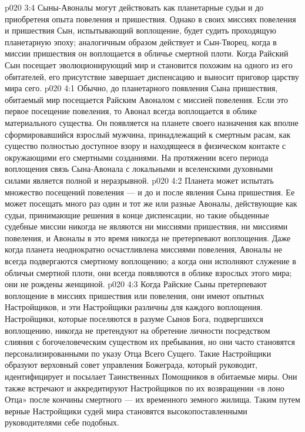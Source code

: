 \vs p020 3:4 Сыны\hyp{}Авоналы могут действовать как планетарные судьи и до приобретеня опыта повеления и пришествия. Однако в своих миссиях повеления и пришествия Сын, испытывающий воплощение, будет судить проходящую планетарную эпоху; аналогичным образом действует и Сын\hyp{}Творец, когда в миссии пришествия он воплощается в обличье смертной плоти. Когда Райский Сын посещает эволюционирующий мир и становится похожим на одного из его обитателей, его присутствие завершает диспенсацию и выносит приговор царству мира сего.
\vs p020 4:1 Обычно, до планетарного появления Сына пришествия, обитаемый мир посещается Райским Авоналом с миссией повеления. Если это первое посещение повеления, то Авонал всегда воплощается в облике материального существа. Он появляется на планете своего назначения как вполне сформировавшийся взрослый мужчина, принадлежащий к смертным расам, как существо полностью доступное взору и находящееся в физическом контакте с окружающими его смертными созданиями. На протяжении всего периода воплощения связь Сына\hyp{}Авонала с локальными и вселенскими духовными силами является полной и неразрывной.
\vs p020 4:2 Планета может испытать множество посещений повеления --- и до и после явления Сына пришествия. Ее может посещать много раз один и тот же или разные Авоналы, действующие как судьи, принимающие решения в конце диспенсации, но такие обыденные судебные миссии никогда не являются ни миссиями пришествия, ни миссиями повеления, и Авоналы в это время никогда не претерпевают воплощения. Даже когда планета неоднократно осчастливлена миссиями повеления, Авоналы не всегда подвергаются смертному воплощению; а когда они исполняют служение в обличьи смертной плоти, они всегда появляются в облике взрослых этого мира; они не рождены женщиной.
\vs p020 4:3 Когда Райские Сыны претерпевают воплощение в миссиях пришествия или повеления, они имеют опытных Настройщиков, и эти Настройщики различны для каждого воплощения. Настройщики, которые поселяются в разуме Сынов Бога, подвергшихся воплощению, никогда не претендуют на обретение личности посредством слияния с богочеловеческим существом их пребывания, но они часто становятся персонализированными по указу Отца Всего Сущего. Такие Настройщики образуют верховный совет управления Божеграда, который руководит, идентифицирует и посылает Таинственных Помощников в обитаемые миры. Они также встречают и аккредитируют Настройщиков по их возвращении «в лоно Отца» после кончины смертного --- их временного земного жилища. Таким путем верные Настройщики судей мира становятся высокопоставленными руководителями себе подобных.
